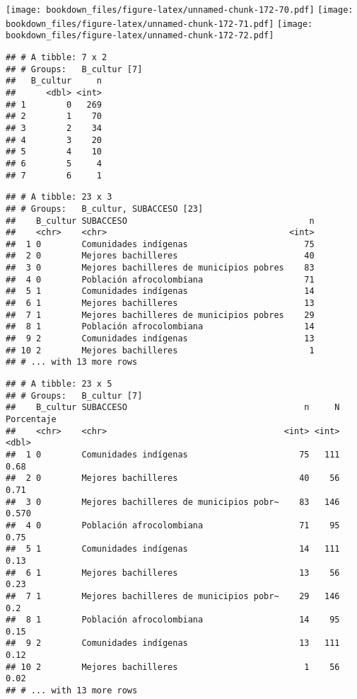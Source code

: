 \documentclass[]{article}
\theoremstyle{definition}
\theoremstyle{definition}
\theoremstyle{definition}
\theoremstyle{remark}
\begin{document}
\texttt{[image: bookdown\_files/figure-latex/unnamed-chunk-172-70.pdf]}
\texttt{[image: bookdown\_files/figure-latex/unnamed-chunk-172-71.pdf]}
\texttt{[image: bookdown\_files/figure-latex/unnamed-chunk-172-72.pdf]}

\begin{verbatim}
## # A tibble: 7 x 2
## # Groups:   B_cultur [7]
##   B_cultur     n
##      <dbl> <int>
## 1        0   269
## 2        1    70
## 3        2    34
## 4        3    20
## 5        4    10
## 6        5     4
## 7        6     1
\end{verbatim}

\begin{verbatim}
## # A tibble: 23 x 3
## # Groups:   B_cultur, SUBACCESO [23]
##    B_cultur SUBACCESO                                    n
##    <chr>    <chr>                                    <int>
##  1 0        Comunidades indígenas                       75
##  2 0        Mejores bachilleres                         40
##  3 0        Mejores bachilleres de municipios pobres    83
##  4 0        Población afrocolombiana                    71
##  5 1        Comunidades indígenas                       14
##  6 1        Mejores bachilleres                         13
##  7 1        Mejores bachilleres de municipios pobres    29
##  8 1        Población afrocolombiana                    14
##  9 2        Comunidades indígenas                       13
## 10 2        Mejores bachilleres                          1
## # ... with 13 more rows
\end{verbatim}

\begin{verbatim}
## # A tibble: 23 x 5
## # Groups:   B_cultur [7]
##    B_cultur SUBACCESO                                   n     N Porcentaje
##    <chr>    <chr>                                   <int> <int>      <dbl>
##  1 0        Comunidades indígenas                      75   111      0.68 
##  2 0        Mejores bachilleres                        40    56      0.71 
##  3 0        Mejores bachilleres de municipios pobr~    83   146      0.570
##  4 0        Población afrocolombiana                   71    95      0.75 
##  5 1        Comunidades indígenas                      14   111      0.13 
##  6 1        Mejores bachilleres                        13    56      0.23 
##  7 1        Mejores bachilleres de municipios pobr~    29   146      0.2  
##  8 1        Población afrocolombiana                   14    95      0.15 
##  9 2        Comunidades indígenas                      13   111      0.12 
## 10 2        Mejores bachilleres                         1    56      0.02 
## # ... with 13 more rows
\end{verbatim}
\end{document}
